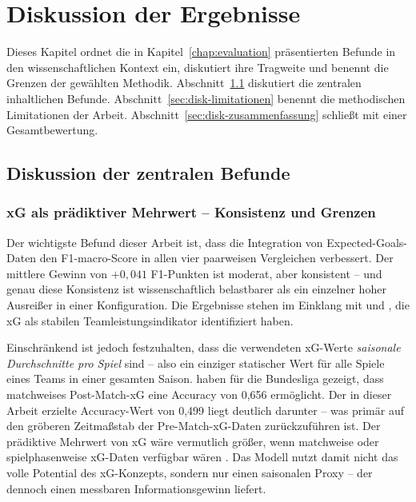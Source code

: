 
\chapter{Diskussion der Ergebnisse}\label{chap:diskussion}

Dieses Kapitel ordnet die in Kapitel~\ref{chap:evaluation} präsentierten
Befunde in den wissenschaftlichen Kontext ein, diskutiert ihre Tragweite
und benennt die Grenzen der gewählten Methodik. Abschnitt~\ref{sec:disk-befunde}
diskutiert die zentralen inhaltlichen Befunde. Abschnitt~\ref{sec:disk-limitationen}
benennt die methodischen Limitationen der Arbeit. Abschnitt~\ref{sec:disk-zusammenfassung}
schließt mit einer Gesamtbewertung.

\section{Diskussion der zentralen Befunde}
\label{sec:disk-befunde}

\subsection{xG als prädiktiver Mehrwert -- Konsistenz und Grenzen}

Der wichtigste Befund dieser Arbeit ist, dass die Integration von
Expected-Goals-Daten den F1-macro-Score in allen vier paarweisen Vergleichen
verbessert. Der mittlere Gewinn von $+0{,}041$ F1-Punkten ist moderat,
aber konsistent -- und genau diese Konsistenz ist wissenschaftlich
belastbarer als ein einzelner hoher Ausreißer in einer Konfiguration.
Die Ergebnisse stehen im Einklang mit \textcite{AnzerBauer2021} und
\textcite{VanEetveldeEtAl2024}, die xG als stabilen Teamleistungsindikator
identifiziert haben.

Einschränkend ist jedoch festzuhalten, dass die verwendeten xG-Werte
\emph{saisonale Durchschnitte pro Spiel} sind -- also ein einziger
statischer Wert für alle Spiele eines Teams in einer gesamten Saison.
\textcite{ForcherEtAl2025} haben für die Bundesliga gezeigt, dass
matchweises Post-Match-xG eine Accuracy von 0,656 ermöglicht. Der in
dieser Arbeit erzielte Accuracy-Wert von 0,499 liegt deutlich darunter
-- was primär auf den gröberen Zeitmaßstab der Pre-Match-xG-Daten
zurückzuführen ist. Der prädiktive Mehrwert von xG wäre vermutlich
größer, wenn matchweise oder spielphasenweise xG-Daten verfügbar wären
\cite{Wheatcroft2022}. Das Modell nutzt damit nicht das volle Potential
des xG-Konzepts, sondern nur einen saisonalen Proxy -- der dennoch
einen messbaren Informationsgewinn liefert.

